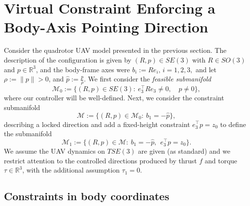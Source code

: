 \documentclass[letterpaper, 10 pt, conference]{ieeeconf}
\begin{document}


\section{Virtual Constraint Enforcing a Body-Axis Pointing Direction}\label{sec:application}

Consider the quadrotor UAV model presented in the previous section. The description of the configuration is given by $(R,p)\in SE(3)$ with $R\in SO(3)$ and $p\in\mathbb{R}^3$, and the body-frame axes were $b_i := R e_i,\, i=1,2,3,$ and let $\rho := \|p\|>0$, and $\hat{p} := \frac{p}{\rho}$. We first consider the \textit{feasible submanifold}
$$\mathcal{M}_{0} := \{(R,p)\in SE(3):\ e_3^\top R e_3 \neq 0, \quad p\neq 0\},$$
where our controller will be well-defined. Next, we consider the constraint submanifold
\begin{equation}\label{eq:M-def}
\mathcal{M} := \{(R,p)\in \mathcal{M}_{0}:\ b_1 = -\hat{p}\},
\end{equation}
describing a locked direction and add a fixed-height constraint $e_3^\top p=z_0$ to define the submanifold
\begin{equation}\label{eq:M1-def}
\mathcal{M}_1 := \{(R,p)\in \mathcal{M}:\ b_1 = -\hat{p},\ \ e_3^\top p=z_0\}.
\end{equation}
We assume the UAV dynamics on $TSE(3)$ are given (as standard) and we restrict attention to the controlled directions produced by thrust $f$ and torque $\tau\in\mathbb{R}^3$, with the additional assumption $\tau_1=0$.


\subsection{Constraints in body coordinates}
\end{document}
